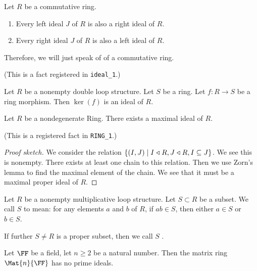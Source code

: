 \begin{theorem}
Let $R$ be a commutative ring.
\begin{enumerate}
\item Every left ideal $J$ of $R$ is also a right ideal of $R$.
\item Every right ideal $J$ of $R$ is also a left ideal of $R$.
\end{enumerate}
Therefore, we will just speak of  of a commutative ring.
\end{theorem}
(This is a fact registered in \texttt{ideal\_1}.)

\begin{theorem}
Let $R$ be a nonempty double loop structure.
Let $S$ be a ring. Let $f\colon R\to S$ be a ring morphism.
Then $\ker(f)$ is an ideal of $R$.
\end{theorem}

\begin{theorem}
Let $R$ be a nondegenerate Ring.
There exists a maximal ideal of $R$.
\end{theorem}

(This is a registered fact in \texttt{RING\_1}.)

\begin{proof}[Proof sketch]
We consider the relation $\{(I,J)\mid I\mathrel{\triangleleft} R, J\mathrel{\triangleleft} R, I\subseteq J\}$.
We see this is nonempty.
There exists at least one chain to this relation.
Then we use Zorn's lemma to find the maximal element of the chain.
We see that it must be a maximal proper ideal of $R$.
\end{proof}

\begin{definition}
Let $R$ be a nonempty multiplicative loop structure.
Let $S\subset R$ be a subset.
We call $S$  to mean: for any elements $a$ and $b$
of $R$, if $ab\in S$, then either $a\in S$ or $b\in S$.

If further $S\neq R$ is a proper subset, then we call $S$ .
\end{definition}

\begin{example}
Let $\FF$ be a field, let $n\geq2$ be a natural number.
Then the matrix ring $\Mat{n}{\FF}$ has no prime ideals.
\end{example}

